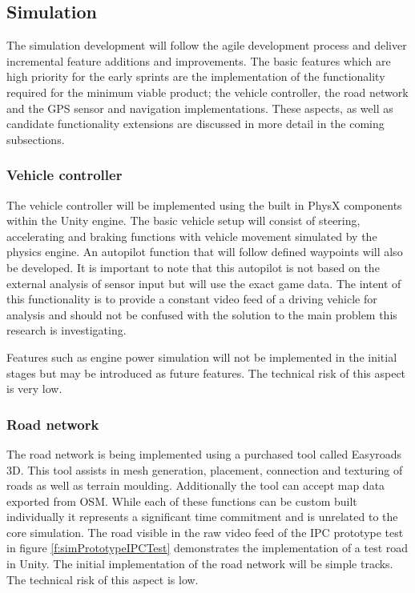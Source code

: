 \documentclass[]{aiaa-tc}%
\begin{document}
\subsection{Simulation}

The simulation development will follow the agile development process and deliver incremental feature additions and improvements. The basic features which are high priority for the early sprints are the implementation of the functionality required for the minimum viable product; the vehicle controller, the road network and the GPS sensor and navigation implementations. These aspects, as well as candidate functionality extensions are discussed in more detail in the coming subsections.

\subsubsection{Vehicle controller}

The vehicle controller will be implemented using the built in PhysX components within the Unity engine. The basic vehicle setup will consist of steering, accelerating and braking functions with vehicle movement simulated by the physics engine. An autopilot function that will follow defined waypoints will also be developed. It is important to note that this autopilot is not based on the external analysis of sensor input but will use the exact game data. The intent of this functionality is to provide a constant video feed of a driving vehicle for analysis and should not be confused with the solution to the main problem this research is investigating.

Features such as engine power simulation will not be implemented in the initial stages but may be introduced as future features. The technical risk of this aspect is very low.

\subsubsection{Road network}

The road network is being implemented using a purchased tool called Easyroads 3D. This tool assists in mesh generation, placement, connection and texturing of roads as well as terrain moulding. Additionally the tool can accept map data exported from OSM. While each of these functions can be custom built individually it represents a significant time commitment and is unrelated to the core simulation. The road visible in the raw video feed of the IPC prototype test in figure \ref{f:simPrototypeIPCTest} demonstrates the implementation of a test road in Unity. The initial implementation of the road network will be simple tracks. The technical risk of this aspect is low.
\end{document}
